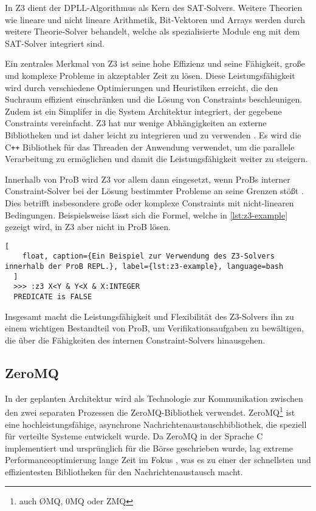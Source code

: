 In Z3 dient der DPLL-Algorithmus als Kern des SAT-Solvers.
Weitere Theorien wie lineare und nicht lineare Arithmetik, Bit-Vektoren und Arrays werden durch weitere Theorie-Solver behandelt,
welche als spezialisierte Module eng mit dem SAT-Solver integriert sind.

Ein zentrales Merkmal von Z3 ist seine hohe Effizienz und seine Fähigkeit,
große und komplexe Probleme in akzeptabler Zeit zu lösen.
Diese Leistungsfähigkeit wird durch verschiedene Optimierungen und Heuristiken erreicht,
die den Suchraum effizient einschränken und die Lösung von Constraints beschleunigen.
Zudem ist ein Simplifer in die System Architektur integriert, der gegebene Constraints vereinfacht.
Z3 hat nur wenige Abhängigkeiten an externe Bibliotheken und ist daher leicht zu integrieren und zu verwenden \cite{z3prover-github}.
Es wird die C\texttt{++} Bibliothek für das Threaden der Anwendung verwendet, um die parallele Verarbeitung zu ermöglichen und damit die Leistungsfähigkeit weiter zu steigern. 

Innerhalb von ProB wird Z3 vor allem dann eingesetzt, wenn ProBs interner Constraint-Solver bei der Lösung bestimmter Probleme an seine Grenzen stößt \cite{10.1007/978-3-319-33693-0_23}.
Dies betrifft insbesondere große oder komplexe Constraints mit nicht-linearen Bedingungen.
Beispielsweise lässt sich die Formel, welche in \cref{lst:z3-example} gezeigt wird, in Z3 aber nicht in ProB lösen.

\begin{lstlisting}[
    float, caption={Ein Beispiel zur Verwendung des Z3-Solvers innerhalb der ProB REPL.}, label={lst:z3-example}, language=bash
  ]
  >>> :z3 X<Y & Y<X & X:INTEGER
  PREDICATE is FALSE
\end{lstlisting}
\FloatBarrier


Insgesamt macht die Leistungsfähigkeit und Flexibilität des Z3-Solvers ihn zu einem wichtigen Bestandteil von ProB,
um Verifikationsaufgaben zu bewältigen, die über die Fähigkeiten des internen Constraint-Solvers hinausgehen.


\subsection{ZeroMQ}
\label{sec:zeromq}

In der geplanten Architektur wird als Technologie zur Kommunikation zwischen den zwei separaten Prozessen die ZeroMQ-Bibliothek \cite{hintjens2013zeromq} verwendet.
ZeroMQ\footnote{auch ØMQ, 0MQ oder ZMQ} ist eine hochleistungsfähige, asynchrone Nachrichtenaustauschbibliothek, die speziell für verteilte Systeme entwickelt wurde.
Da ZeroMQ in der Sprache C implementiert und ursprünglich für die Börse geschrieben wurde, lag extreme Performanceoptimierung lange Zeit im Fokus \cite{sustrik2015zeromq},
was es zu einer der schnellsten und effizientesten Bibliotheken für den Nachrichtenaustausch macht.

